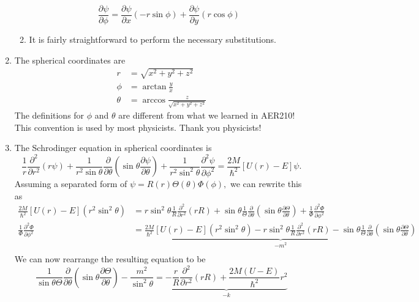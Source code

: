 \documentclass{article}
\begin{document}
\begin{enumerate}[label=(8.\arabic*)]
\begin{enumerate}
        \begin{equation}
            \frac{\partial \psi}{\partial \phi} = \frac{\partial \psi}{\partial x}(-r\sin\phi) + \frac{\partial \psi}{\partial y}(r\cos\phi)
        \end{equation}
        \item It is fairly straightforward to perform the necessary substitutions.
    \end{enumerate}
    \item The spherical coordinates are
    \begin{align*}
        r &= \sqrt{x^2+y^2+z^2} \\ 
        \phi &= \arctan \frac{y}{x} \\ 
        \theta &= \arccos \frac{z}{\sqrt{x^2+y^2+z^2}}
    \end{align*}
     The definitions for $\phi$ and $\theta$ are different from what we learned in AER210! This convention is used by most physicists. Thank you physicists!
    \setcounter{enumi}{21}
    \item The Schrodinger equation in spherical coordinates is 
    \begin{equation}
        \frac{1}{r}\frac{\partial^2}{\partial r^2}(r\psi) + \frac{1}{r^2\sin\theta}\frac{\partial}{\partial \theta}\left(\sin\theta \frac{\partial \psi}{\partial \theta}\right) + \frac{1}{r^2\sin^2\theta}\frac{\partial^2\psi}{\partial \phi^2} = \frac{2M}{\hbar^2}[U(r)-E]\psi.
    \end{equation}
    Assuming a separated form of $\psi = R(r)\Theta(\theta)\Phi(\phi),$ we can rewrite this as
    \begin{align*}
        \frac{2M}{\hbar^2}[U(r)-E](r^2\sin^2\theta) &= r\sin^2\theta\frac{1}{R}\frac{\partial^2}{\partial r^2}(rR) + \sin\theta\frac{1}{\Theta}\frac{\partial}{\partial \theta}\left(\sin\theta \frac{\partial \Theta}{\partial \theta}\right) + \frac{1}{\Phi}\frac{\partial^2\Phi}{\partial \phi^2} \\
        \frac{1}{\Phi}\frac{\partial^2\Phi}{\partial \phi^2} &= \underbrace{\frac{2M}{\hbar^2}[U(r)-E](r^2\sin^2\theta) - r\sin^2\theta\frac{1}{R}\frac{\partial^2}{\partial r^2}(rR) - \sin\theta\frac{1}{\Theta}\frac{\partial}{\partial \theta}\left(\sin\theta \frac{\partial \Theta}{\partial \theta}\right)}_{-m^2} \\ 
    \end{align*}
    We can now rearrange the resulting equation to be
    \begin{equation}
        \frac{1}{\sin\theta \Theta}\frac{\partial}{\partial\theta}(\sin\theta \frac{\partial \Theta}{\partial \theta}) - \frac{m^2}{\sin^2\theta} = \underbrace{-\frac{r}{R} \frac{\partial^2}{\partial r^2}(rR)+\frac{2M(U-E)}{\hbar^2}r^2}_{-k}

\end{equation}
\end{enumerate}
\end{document}
